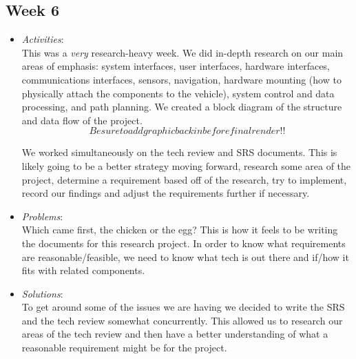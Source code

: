 \documentclass[compsoc,draftclsnofoot,onecolumn,10pt]{IEEEtran}
\begin{document}
\subsection{Week 6}
	\begin{itemize}
        \item \textit{Activities}:\\
            This was a \textit{very} research-heavy week. We did in-depth
            research on our main areas of emphasis: system interfaces, user
            interfaces, hardware interfaces, communications interfaces, sensors,
            navigation, hardware mounting (how to physically attach the
            components to the vehicle), system control and data processing, and
            path planning. We created a block diagram of the structure and data
            flow of the project.\\

			\[Be sure to add graphic back in before final render!!\]

            We worked simultaneously on the tech review and SRS documents. This
            is likely going to be a better strategy moving forward, research
            some area of the project, determine a requirement based off of the
            research, try to implement, record our findings and adjust the
            requirements further if necessary.

        \item \textit{Problems}:\\
            Which came first, the chicken or the egg? This is how it feels to be
            writing the documents for this research project. In order to know what
            requirements are reasonable/feasible, we need to know what tech is out
            there and if/how it fits with related components.

        \item \textit{Solutions}:\\
            To get around some of the issues we are having we decided to write
            the SRS and the tech review somewhat concurrently. This allowed us
            to research our areas of the tech review and then have a better
            understanding of what a reasonable requirement might be for the
            project.

	\end{itemize}
   
\end{document}
